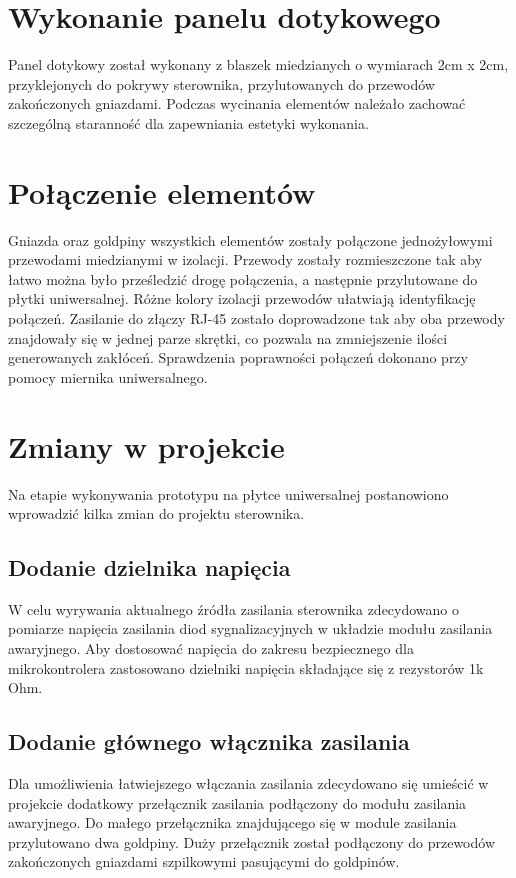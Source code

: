 \documentclass[11pt]{report}
\begin{document}
  \section{Wykonanie panelu dotykowego}
 Panel dotykowy został wykonany z blaszek miedzianych o wymiarach 2cm x 2cm, przyklejonych do pokrywy sterownika, przylutowanych do przewodów zakończonych gniazdami. Podczas wycinania elementów należało zachować szczególną staranność dla zapewniania estetyki wykonania.

 \section{Połączenie elementów}
 Gniazda oraz goldpiny wszystkich elementów zostały połączone jednożyłowymi przewodami miedzianymi w izolacji. Przewody zostały rozmieszczone tak aby łatwo można było prześledzić drogę połączenia, a następnie przylutowane do płytki uniwersalnej. Różne kolory izolacji przewodów ułatwiają identyfikację połączeń. Zasilanie do złączy RJ-45 zostało doprowadzone tak aby oba przewody znajdowały się w jednej parze skrętki, co pozwala na zmniejszenie ilości generowanych zakłóceń.
 Sprawdzenia poprawności połączeń dokonano przy pomocy miernika uniwersalnego.

 \section{Zmiany w projekcie}
 Na etapie wykonywania prototypu na płytce uniwersalnej postanowiono wprowadzić kilka zmian do projektu sterownika.
 \subsection{Dodanie dzielnika napięcia}
 W celu wyrywania aktualnego źródła zasilania sterownika zdecydowano o pomiarze napięcia zasilania diod sygnalizacyjnych w układzie modułu zasilania awaryjnego. Aby dostosować napięcia do zakresu bezpiecznego dla mikrokontrolera zastosowano dzielniki napięcia składające się z rezystorów 1k Ohm.
 \subsection{Dodanie głównego włącznika zasilania}
 Dla umożliwienia łatwiejszego włączania zasilania zdecydowano się umieścić w projekcie dodatkowy przełącznik zasilania podłączony do modułu zasilania awaryjnego. Do małego przełącznika znajdującego się w module zasilania przylutowano dwa goldpiny. Duży przełącznik został podłączony do przewodów zakończonych gniazdami szpilkowymi pasującymi do goldpinów.
\end{document}
